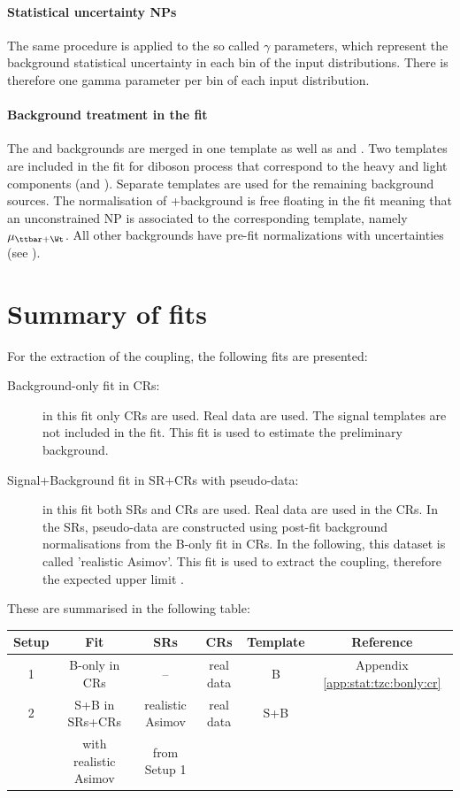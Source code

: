 \paragraph{Statistical uncertainty NPs} The same procedure is applied
to the so called $\gamma$ parameters, which represent the background
statistical uncertainty in each bin of the input distributions.
There is therefore one gamma parameter per bin of each input distribution. 

\paragraph{Background treatment in the fit} The \ttZ and \tWZ backgrounds are merged in one template as well as
\ttbar and \Wt. Two templates are included in the fit for diboson process that correspond to the heavy and light components (\VVHF and \VVLF).
Separate templates are used for the remaining background sources.
The normalisation of \ttbar+\Wt background is free floating in the fit meaning that an unconstrained NP is associated to the corresponding template, namely $\mu_{\ttbar+\Wt}$.
All other backgrounds have pre-fit normalizations with uncertainties (see ).

\clearpage
\FloatBarrier

\section{Summary of fits}
\label{sec:stat:summary}
For the extraction of the \tZc coupling, the following fits
are presented:
\begin{description}
	\item[Background-only fit in CRs:] in this fit only CRs are used. Real data are
	used. The signal templates are not included in the fit. This fit is used to estimate
	the preliminary background.
	\item[Signal+Background fit in SR+CRs with pseudo-data:] in this fit both SRs and CRs are used. Real
	data are used in the CRs. In the SRs, pseudo-data are constructed
	using post-fit background normalisations from the B-only fit in CRs. In the following, this dataset is called 'realistic Asimov'. This fit is used to extract
	the \tZc coupling, therefore the expected upper limit .
\end{description}
These are summarised in the following table:

\begin{table}[htbp]
	\small
	\centering
	\begin{tabular}{cccccc}
		\toprule
		Setup & Fit & SRs & CRs & Template & Reference \\
		\midrule
		1 & B-only in CRs & -- & real data & B  & Appendix \ref{app:stat:tzc:bonly:cr} \\
		\midrule
		2 & S+B in SRs+CRs & realistic Asimov & real data & S+B  & \Cref{sec:stat:tzc:splusb:crsr} \\
		& with realistic Asimov & from Setup 1 & & & \\
		\bottomrule
	\end{tabular}
\end{table}

